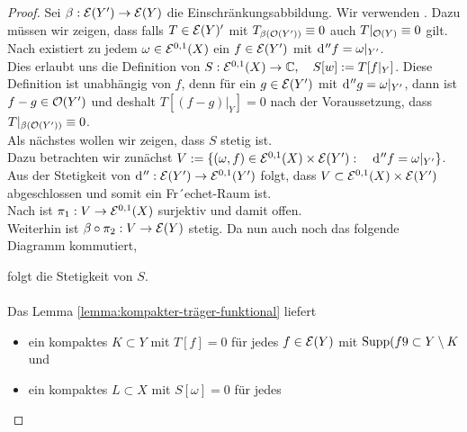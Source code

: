 \begin{proof}
  Sei $\beta: \mathcal{E}(Y') \rightarrow \mathcal{E}(Y)$ die Einschränkungsabbildung. Wir
  verwenden \cite[Kor B.10]{For}. Dazu müssen wir zeigen, dass falls $T \in
  \mathcal{E}(Y)'$ mit $T_{\beta(\mathcal{O}(Y'))} \equiv 0$ auch $T|_{\mathcal{O}(Y)}
  \equiv 0$ gilt. \\
  Nach \cite[Kor. 14.16]{For} existiert zu jedem $\omega \in \mathcal{E}^{0,1}(X)$ ein $f \in
  \mathcal{E}(Y')$ mit $\d[''f] = \omega|_{Y'}$. \\
  Dies erlaubt uns die Definition von $S: \mathcal{E}^{0,1}(X) \rightarrow \mathbb{C}, \quad
  S[w] := T[f|_Y]$. Diese Definition ist unabhängig von $f$, denn für
  ein $g \in \mathcal{E}(Y')$ mit $\d[''g] = \omega|_{Y'}$, dann ist $f-g
  \in \mathcal{O}(Y')$ und deshalt $T[(f-g)|_Y] = 0$ nach der Voraussetzung,
  dass $T|_{\beta(\mathcal{O}(Y'))} \equiv 0$. \\
  Als nächstes wollen wir zeigen, dass $S$ stetig ist. \\
  Dazu betrachten wir zunächst $V := \{ (\omega, f) \in \diff^{0,1}(X)
  \times \diff(Y'): \quad \d[''f] = \omega|_{Y'} \}$. Aus der
  Stetigkeit von $\d['']: \diff(Y') \ra \diff^{0,1}(Y')$ folgt, dass $V
  \subset \mathcal{E}^{0,1}(X) \times \mathcal{E}(Y')$ abgeschlossen und somit ein
  Fr´echet-Raum ist. \\
  Nach \cite[Kor. 14.16]{For} ist $\pi_1: V \rightarrow \mathcal{E}^{0,1}(X)$ surjektiv und damit
  offen. \\
  Weiterhin ist $\beta \circ \pi_2 : V \rightarrow \mathcal{E}(Y)$ stetig. Da nun
  auch noch das folgende Diagramm kommutiert,
  \begin{center}
  \end{center}
  folgt die Stetigkeit von $S$. \\
  \\
  Das Lemma \ref{lemma:kompakter-träger-funktional} liefert
  \begin{itemize}
  \item ein kompaktes $K \subset Y$ mit $T[f] = 0$ für jedes $f \in
    \mathcal{E}(Y)$ mit $\operatorname{Supp}(f9 \subset Y \setminus K$ und
  \item ein kompaktes $L \subset X$ mit $S[\omega] = 0$ für jedes

\end{itemize}
\end{proof}
